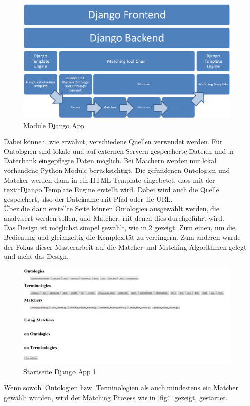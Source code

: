 		\begin{figure}[ht]
		\centering
		\includegraphics[width=1.0\textwidth]{pics/Module-overview1.png}
		\caption{Module Django App}
		\label{fig6}
		\end{figure}
		Dabei können, wie erwähnt, verschiedene Quellen verwendet werden. Für
		Ontologien sind lokale und auf externen Servern gespeicherte Dateien und in Datenbank
		eingepflegte Daten möglich. Bei Matchern werden nur lokal vorhandene Python
		Module berücksichtigt. Die gefundenen Ontologien und Matcher werden dann in
		ein HTML Template eingebetet, dass mit der textit{Django Template Engine} erstellt wird. Dabei wird auch die Quelle gespeichert, also der Dateiname mit Pfad oder
		die URL.\\
		Über die dann erstellte Seite können Ontologien ausgewählt werden, die
		analyisert werden sollen, und Matcher, mit denen dies durchgeführt wird.\\
		Das Design ist möglichst simpel gewählt, wie in \ref{fig3} gezeigt. Zum einen,
		um die Bedienung und gleichzeitig die Komplexität zu verringern. Zum anderen wurde der Fokus dieser
		Masterarbeit auf die Matcher und Matching Algorithmen gelegt und nicht das
		Design.
		
		\begin{figure}[ht]
		\centering
		\includegraphics[width=1.0\textwidth]{pics/TemplateMatchingStartPage.png}
		\caption{Startseite Django App 1}
		\label{fig3}
		\end{figure}
		Wenn sowohl Ontologien bzw. Terminologien als auch mindestens ein Matcher
		gewählt wurden, wird der Matching Prozess wie in \ref{fig4} gezeigt,
		gestartet.
		
